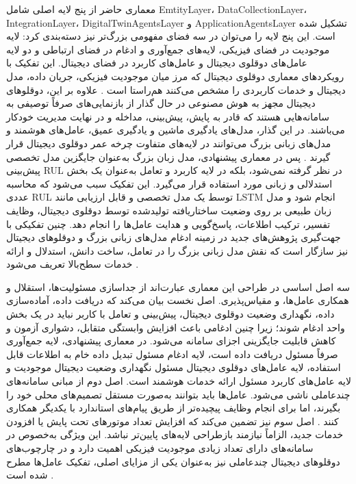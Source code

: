 معماری حاضر از پنج لایه اصلی شامل \gls{EmtityLayer}، \gls{DataCollectionLayer}، \gls{IntegrationLayer}، \gls{DigitalTwinAgentsLayer} و \gls{ApplicationAgentsLayer} تشکیل شده است. این پنج لایه را می‌توان در سه فضای مفهومی بزرگ‌تر نیز دسته‌بندی کرد: لایه موجودیت در فضای فیزیکی، لایه‌های جمع‌آوری و ادغام در فضای ارتباطی و دو لایه عامل‌های دوقلوی دیجیتال و عامل‌های کاربرد در فضای دیجیتال. این تفکیک با رویکردهای معماری دوقلوی دیجیتال که مرز میان موجودیت فیزیکی، جریان داده، مدل دیجیتال و خدمات کاربردی را مشخص می‌کنند هم‌راستا است \cite{tao2019digital,qi2021enabling}. علاوه بر این، دوقلوهای دیجیتال مجهز به هوش مصنوعی در حال گذار از بازنمایی‌های صرفاً توصیفی به سامانه‌هایی هستند که قادر به پایش، پیش‌بینی، مداخله و در نهایت مدیریت خودکار می‌باشند. در این گذار، مدل‌های یادگیری ماشین و یادگیری عمیق، عامل‌های هوشمند و مدل‌های زبانی بزرگ می‌توانند در لایه‌های متفاوت چرخه عمر دوقلوی دیجیتال قرار گیرند \cite{zhou2026dtai,fu2026genaidt}. پس در معماری پیشنهادی، مدل زبان بزرگ به‌عنوان جایگزین مدل تخصصی پیش‌بینی \gls{RUL} در نظر گرفته نمی‌شود، بلکه در لایه کاربرد و تعامل به‌عنوان یک بخش استدلالی و زبانی مورد استفاده قرار می‌گیرد. این تفکیک سبب می‌شود که محاسبه عددی \gls{RUL} توسط یک مدل تخصصی و قابل ارزیابی مانند LSTM انجام شود و مدل زبان طبیعی بر روی وضعیت ساختاریافته تولیدشده توسط دوقلوی دیجیتال، وظایف تفسیر، ترکیب اطلاعات، پاسخ‌گویی و هدایت عامل‌ها را انجام دهد. چنین تفکیکی با جهت‌گیری پژوهش‌های جدید در زمینه ادغام مدل‌های زبانی بزرگ و دوقلو‌های دیجیتال نیز سازگار است که نقش مدل زبانی بزرگ را در تعامل، ساخت دانش، استدلال و ارائه خدمات سطح‌بالا تعریف می‌شود \cite{CHEN2025102982LLMDT,zhou2026dtai,maghanaki2026llmmanufacturing}.

سه اصل اساسی در طراحی این معماری عبارت‌اند از جداسازی مسئولیت‌ها، استقلال و همکاری عامل‌ها، و مقیاس‌پذیری. اصل نخست بیان می‌کند که دریافت داده، آماده‌سازی داده، نگهداری وضعیت دوقلوی دیجیتال، پیش‌بینی و تعامل با کاربر نباید در یک بخش واحد ادغام شوند؛ زیرا چنین ادغامی باعث افزایش وابستگی متقابل، دشواری آزمون و کاهش قابلیت جایگزینی اجزای سامانه می‌شود. در معماری پیشنهادی، لایه جمع‌آوری صرفاً مسئول دریافت داده است، لایه ادغام مسئول تبدیل داده خام به اطلاعات قابل استفاده، لایه عامل‌های دوقلوی دیجیتال مسئول نگهداری وضعیت دیجیتال موجودیت و لایه عامل‌های کاربرد مسئول ارائه خدمات هوشمند است. اصل دوم از مبانی سامانه‌های چندعاملی ناشی می‌شود. عامل‌ها باید بتوانند به‌صورت مستقل تصمیم‌های محلی خود را بگیرند، اما برای انجام وظایف پیچیده‌تر از طریق پیام‌های استاندارد با یکدیگر همکاری کنند \cite{dorri2018multiagent,pretel2022masdt}. اصل سوم نیز تضمین می‌کند که افزایش تعداد موتورهای تحت پایش یا افزودن خدمات جدید، الزاماً نیازمند بازطراحی لایه‌های پایین‌تر نباشد. این ویژگی به‌خصوص در سامانه‌های دارای تعداد زیادی موجودیت فیزیکی اهمیت دارد و در چارچوب‌های دوقلو‌های دیجیتال چندعاملی نیز به‌عنوان یکی از مزایای اصلی، تفکیک عامل‌ها مطرح شده است \cite{lopez2024madtwin,wang2024multiagent}.

